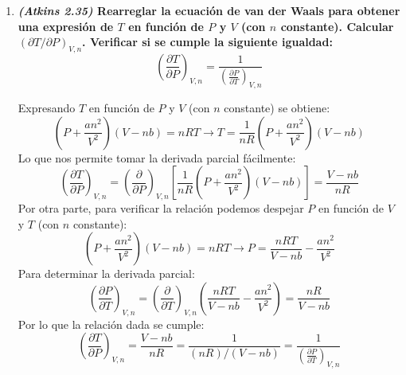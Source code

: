 \documentclass[a4paper,12pt]{article}
\begin{document}
\begin{enumerate}
 \item \textbf{\textit{(Atkins 2.35)} Rearreglar la ecuaci\'on de van der Waals para obtener una expresi\'on de $T$ en funci\'on de $P$ y $V$ (con $n$ constante). Calcular $(\partial T/\partial P)_{V,n}$. Verificar si se cumple la siguiente igualdad:
$$\left(\frac{\partial T}{\partial P}\right)_{V,n}=\frac{1}{\left(\frac{\partial P}{\partial T}\right)_{V,n}}$$} %

Expresando $T$ en funci\'on de $P$ y $V$ (con $n$ constante) se obtiene:
$$\left(P+\frac{an^2}{V^2}\right)\left(V-nb\right)=nRT\rightarrow T=\frac{1}{nR}\left(P+\frac{an^2}{V^2}\right)\left(V-nb\right)$$
Lo que nos permite tomar la derivada parcial f\'acilmente:
$$\left(\frac{\partial T}{\partial P}\right)_{V,n}=\left(\frac{\partial }{\partial P}\right)_{V,n}\left[\frac{1}{nR}\left(P+\frac{an^2}{V^2}\right)\left(V-nb\right)\right]=\frac{V-nb}{nR}$$
Por otra parte, para verificar la relaci\'on podemos despejar $P$ en funci\'on de $V$ y $T$ (con $n$ constante):
$$\left(P+\frac{an^2}{V^2}\right)\left(V-nb\right)=nRT\rightarrow P=\frac{nRT}{V-nb}-\frac{an^2}{V^2}$$
Para determinar la derivada parcial:
$$\left(\frac{\partial P}{\partial T}\right)_{V,n}=\left(\frac{\partial }{\partial T}\right)_{V,n}\left(\frac{nRT}{V-nb}-\frac{an^2}{V^2}\right)=\frac{nR}{V-nb}$$
Por lo que la relaci\'on dada se cumple:
$$\left(\frac{\partial T}{\partial P}\right)_{V,n}=\frac{V-nb}{nR}=\frac{1}{(nR)/(V-nb)}=\frac{1}{\left(\frac{\partial P}{\partial T}\right)_{V,n}}$$

\end{enumerate}
\end{document}

